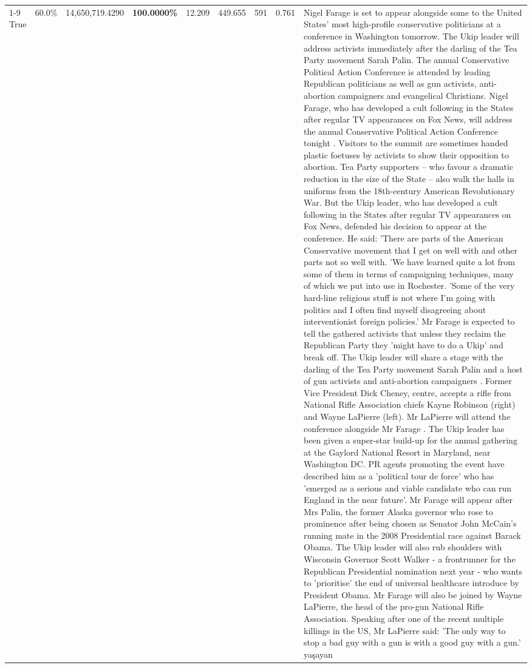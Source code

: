 \begin{table}[H]
\begin{tabular}{lllrlllll}
\cline{1-9}
True & 60.0\% & 14,650,719.4290 & \bfseries \color{red} 100.0000\% & 12.209 & 449.655 & 591 & 0.761 & Nigel Farage is set to appear alongside some to the United States' most high-profile conservative politicians at a conference in Washington tomorrow. The Ukip leader will address activists immediately after the darling of the Tea Party movement Sarah Palin. The annual Conservative Political Action Conference is attended by leading Republican politicians as well as gun activists, anti-abortion campaigners and evangelical Christians. Nigel Farage, who has developed a cult following in the States after regular TV appearances on Fox News, will address the annual Conservative Political Action Conference tonight . Visitors to the summit are sometimes handed plastic foetuses by activists to show their opposition to abortion. Tea Party supporters – who favour a dramatic reduction in the size of the State – also walk the halls in uniforms from the 18th-century American Revolutionary War. But the Ukip leader, who has developed a cult following in the States after regular TV appearances on Fox News, defended his decision to appear at the conference. He said: 'There are parts of the American Conservative movement that I get on well with and other parts not so well with. 'We have learned quite a lot from some of them in terms of campaigning techniques, many of which we put into use in Rochester. 'Some of the very hard-line religious stuff is not where I'm going with politics and I often find myself disagreeing about interventionist foreign policies.' Mr Farage is expected to tell the gathered activists that unless they reclaim the Republican Party they 'might have to do a Ukip' and break off. The Ukip leader will share a stage with the darling of the Tea Party movement Sarah Palin and a host of gun activists and anti-abortion campaigners . Former Vice President Dick Cheney, centre, accepts a rifle from National Rifle Association chiefs Kayne Robinson (right) and Wayne LaPierre (left). Mr LaPierre will attend the conference alongside Mr Farage . The Ukip leader has been given a super-star build-up for the annual gathering at the Gaylord National Resort in Maryland, near Washington DC. PR agents promoting the event have described him as a 'political tour de force' who has 'emerged as a serious and viable candidate who can run England in the near future'. Mr Farage will appear after Mrs Palin, the former Alaska governor who rose to prominence after being chosen as Senator John McCain's running mate in the 2008 Presidential race against Barack Obama. The Ukip leader will also rub shoulders with Wisconsin Governor Scott Walker - a frontrunner for the Republican Presidential nomination next year - who wants to 'prioritise' the end of universal healthcare introduce by President Obama. Mr Farage will also be joined by Wayne LaPierre, the head of the pro-gun National Rifle Association. Speaking after one of the recent multiple killings in the US, Mr LaPierre said: 'The only way to stop a bad guy with a gun is with a good guy with a gun.' yaşayan \\

\end{tabular}
\end{table}
